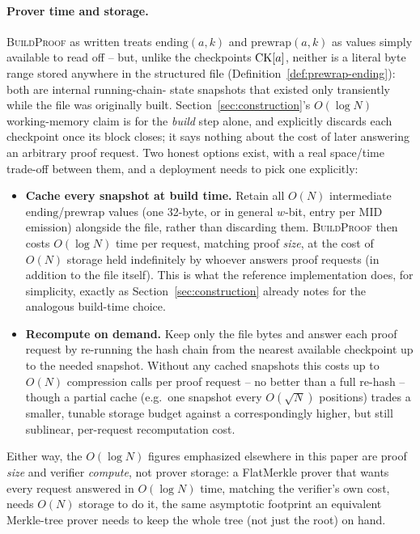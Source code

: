 \paragraph{Prover time and storage.} \textsc{BuildProof} as written treats
$\mathrm{ending}(a,k)$ and $\mathrm{prewrap}(a,k)$ as values simply
available to read off -- but, unlike the checkpoints $\mathrm{CK}[a]$, neither is a
literal byte range stored anywhere in the structured file
(Definition~\ref{def:prewrap-ending}): both are internal running-chain-
state snapshots that existed only transiently while the file was originally
built. Section~\ref{sec:construction}'s $O(\log N)$ working-memory claim is
for the \emph{build} step alone, and explicitly discards each checkpoint
once its block closes; it says nothing about the cost of later answering an
arbitrary proof request. Two honest options exist, with a real space/time
trade-off between them, and a deployment needs to pick one explicitly:
\begin{itemize}
\item \textbf{Cache every snapshot at build time.} Retain all $O(N)$
  intermediate $\mathrm{ending}$/$\mathrm{prewrap}$ values (one 32-byte, or
  in general $w$-bit, entry per $\mathrm{MID}$ emission) alongside the
  file, rather than discarding them. \textsc{BuildProof} then costs
  $O(\log N)$ time per request, matching proof \emph{size}, at the cost of
  $O(N)$ storage held indefinitely by whoever answers proof requests (in
  addition to the file itself). This is what the reference implementation
  does, for simplicity, exactly as Section~\ref{sec:construction} already
  notes for the analogous build-time choice.
\item \textbf{Recompute on demand.} Keep only the file bytes and answer
  each proof request by re-running the hash chain from the nearest
  available checkpoint up to the needed snapshot. Without any cached
  snapshots this costs up to $O(N)$ compression calls per proof request --
  no better than a full re-hash -- though a partial cache (e.g.\ one
  snapshot every $O(\sqrt{N})$ positions) trades a smaller, tunable storage
  budget against a correspondingly higher, but still sublinear, per-request
  recomputation cost.
\end{itemize}
Either way, the $O(\log N)$ figures emphasized elsewhere in this paper are
proof \emph{size} and verifier \emph{compute}, not prover storage: a
FlatMerkle prover that wants every request answered in $O(\log N)$ time,
matching the verifier's own cost, needs $O(N)$ storage to do it, the same
asymptotic footprint an equivalent Merkle-tree prover needs to keep the
whole tree (not just the root) on hand.

